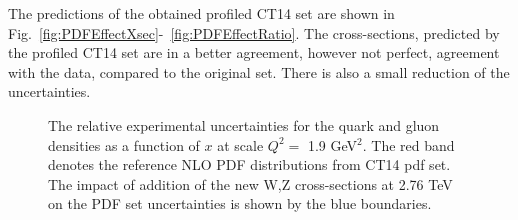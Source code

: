 The predictions of the obtained profiled CT14 set are shown in Fig.~\ref{fig:PDFEffectXsec}-~\ref{fig:PDFEffectRatio}. The cross-sections, predicted by the profiled CT14 set are in a better agreement, however not perfect, agreement with the data, compared to the original set. There is also a small reduction of the uncertainties.

\begin{figure}[!tbp]
\begin{minipage}[h]{0.43\linewidth}
\end{minipage}
\hfill
\begin{minipage}[h]{0.43\linewidth}
\end{minipage}
\vfill
\begin{minipage}[h]{0.43\linewidth}
\end{minipage}
\hfill
\begin{minipage}[h]{0.43\linewidth}
\end{minipage}
\vfill
\begin{minipage}[h]{0.43\linewidth}
\end{minipage}
\hfill
\begin{minipage}[h]{0.43\linewidth}
\end{minipage}
\caption{The relative experimental uncertainties for the quark and gluon densities as a function of $x$ at scale $Q^2=$ 1.9 GeV$^2$. The red band denotes the reference NLO PDF distributions from CT14 pdf set. The impact of addition of the new W,Z cross-sections at 2.76 TeV on the PDF set uncertainties is shown by the blue boundaries.}
\label{fig:PDFSensitStrange}
\end{figure}

